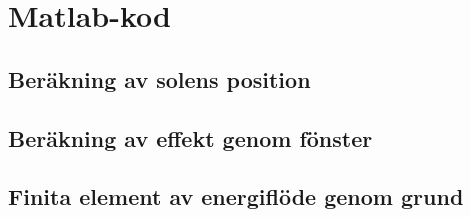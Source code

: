 \newpage
\chapter{Matlab-kod}
\label{sec:mcode}


\section{Beräkning av solens position}\label{app:sunposition}



\section{Beräkning av effekt genom fönster}\label{app:sunwindows}






\section{Finita element av energiflöde genom grund}\label{app:femfoundation}








